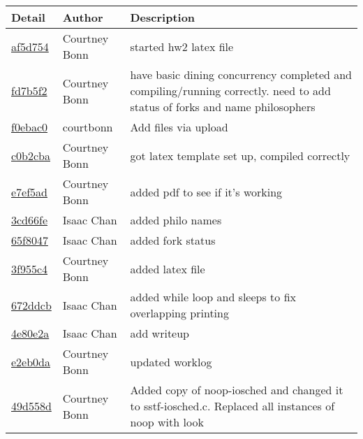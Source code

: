 \begin{tabular}{p{2cm} p{2cm} p{10cm}}\textbf{Detail} & \textbf{Author} & \textbf{Description}\\\hline
\href{https://github.com/courtbonn/CS-444/commit/af5d754ea19c6bdc6fb977d874932a62b5176beb}{af5d754} & Courtney Bonn & started hw2 latex file\\\hline
\href{https://github.com/courtbonn/CS-444/commit/fd7b5f2f08a4033193091a2c005324d4e8c83dad}{fd7b5f2} & Courtney Bonn & have basic dining concurrency completed and compiling/running correctly. need to add status of forks and name philosophers\\\hline
\href{https://github.com/courtbonn/CS-444/commit/f0ebac09ef7efebaa007d5d0335d6622f2d72c31}{f0ebac0} & courtbonn & Add files via upload\\\hline
\href{https://github.com/courtbonn/CS-444/commit/c0b2cba2793c2b835c345de95d1adc408d3590a8}{c0b2cba} & Courtney Bonn & got latex template set up, compiled correctly\\\hline
\href{https://github.com/courtbonn/CS-444/commit/e7ef5ade60f7075aff7ea7a35a0a7576ad37fbb0}{e7ef5ad} & Courtney Bonn & added pdf to see if it's working\\\hline
\href{https://github.com/courtbonn/CS-444/commit/3cd66fe985151af1a961c9a1510d90d5906b56b5}{3cd66fe} & Isaac Chan & added philo names\\\hline
\href{https://github.com/courtbonn/CS-444/commit/65f8047ce747c6c81206c1b4b7e687d9eb404386}{65f8047} & Isaac Chan & added fork status\\\hline
\href{https://github.com/courtbonn/CS-444/commit/3f955c4d2095239ff38e446b64420fbad1581329}{3f955c4} & Courtney Bonn & added latex file\\\hline
\href{https://github.com/courtbonn/CS-444/commit/672ddcb03b3772fe388444afa3ef9f497483dab5}{672ddcb} & Isaac Chan & added while loop and sleeps to fix overlapping printing\\\hline
\href{https://github.com/courtbonn/CS-444/commit/4e80e2ae4644e5814c5c5ab02280c36ff4fb7cd1}{4e80e2a} & Isaac Chan & add writeup\\\hline
\href{https://github.com/courtbonn/CS-444/commit/e2eb0dad4d249310f06385038a952f71a68c356a}{e2eb0da} & Courtney Bonn & updated worklog\\\hline
\href{https://github.com/courtbonn/CS-444/commit/49d558d3f3bae0525a168a7cb1f950dc5d4df2c4}{49d558d} & Courtney Bonn & Added copy of noop-iosched and changed it to sstf-iosched.c. Replaced all instances of noop with look\\\hline

\end{tabular}

